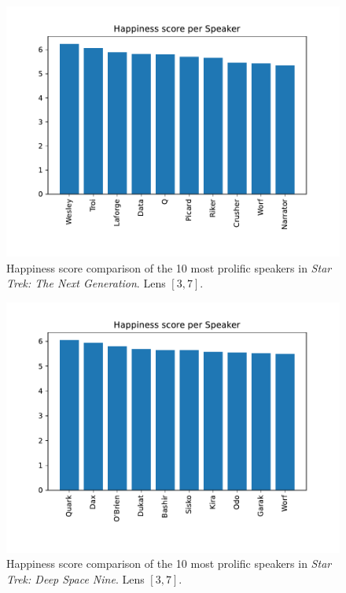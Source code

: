 \begin{figure}
  \centering
  \includegraphics[width=\columnwidth]{figures/localized/tng_speaker_happiness_scores.pdf}
  \caption{Happiness score comparison of the 10 most prolific speakers in \textit{Star Trek: The Next Generation}. Lens $[3, 7]$.}
  \label{fig:tng_happiness}
\end{figure}

\begin{figure}
  \centering
  \includegraphics[width=\columnwidth]{figures/localized/ds9_speaker_happiness_scores.pdf}
  \caption{Happiness score comparison of the 10 most prolific speakers in \textit{Star Trek: Deep Space Nine}. Lens $[3, 7]$.}
  \label{fig:ds9_happiness}
\end{figure}

